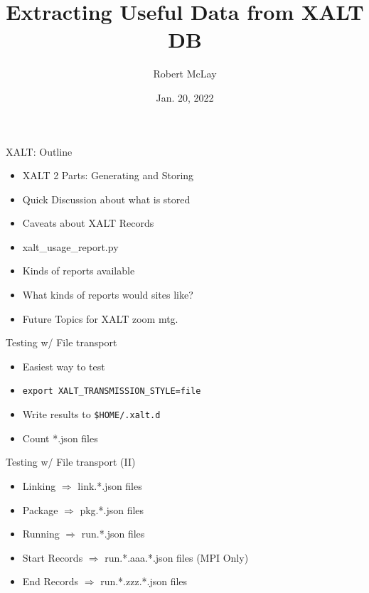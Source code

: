 \documentclass{beamer}
\begin{document}
\title[XALT]{Extracting Useful Data from XALT DB}
\author{Robert McLay} 
\date{Jan. 20, 2022} 

\frame{\titlepage} 

\begin{frame}{XALT: Outline}
  \begin{itemize}
    \item XALT 2 Parts: Generating and Storing
    \item Quick Discussion about what is stored
    \item Caveats about XALT Records
    \item xalt_usage_report.py
    \item Kinds of reports available
    \item What kinds of reports would sites like?
    \item Future Topics for XALT zoom mtg.
  \end{itemize}
\end{frame}

\begin{frame}{Testing w/ File transport}
  \begin{itemize}
    \item Easiest way to test
    \item \texttt{export XALT\_TRANSMISSION\_STYLE=file}
    \item Write results to \texttt{\$HOME/.xalt.d}
    \item Count *.json files
  \end{itemize}
\end{frame}

\begin{frame}{Testing w/ File transport (II)}
  \begin{itemize}
    \item Linking $\Rightarrow$ link.*.json files 
    \item Package $\Rightarrow$ pkg.*.json files 
    \item Running $\Rightarrow$ run.*.json files 
    \item Start Records $\Rightarrow$ run.*.aaa.*.json files (MPI Only)
    \item End Records $\Rightarrow$ run.*.zzz.*.json files 
  \end{itemize}
\end{frame}
\end{document}
